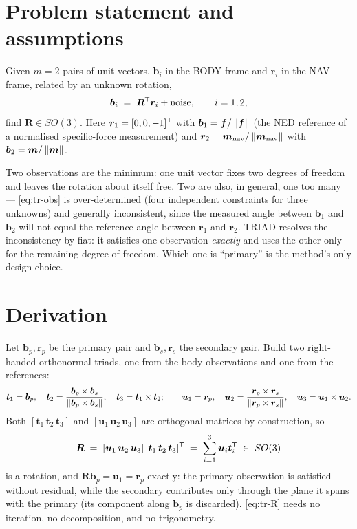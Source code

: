 \section{Problem statement and assumptions}
Given $m=2$ pairs of unit vectors, $\bm{b}_i$ in the BODY frame and $\bm{r}_i$ in the NAV frame,
related by an unknown rotation,
\begin{equation}
\bm{b}_i \;=\; \bm{R}^{\mathsf{T}}\bm{r}_i + \text{noise},\qquad i=1,2,
\label{eq:tr-obs}
\end{equation}
find $\bm{R}\in SO(3)$. Here $\bm{r}_1=[0,0,-1]^{\mathsf{T}}$ with $\bm{b}_1=\bm{f}/\left\lVert \bm{f} \right\rVert$ (the NED
reference of a normalised specific-force measurement) and
$\bm{r}_2=\bm{m}_{\text{nav}}/\left\lVert \bm{m}_{\text{nav}} \right\rVert$ with $\bm{b}_2=\bm{m}/\left\lVert \bm{m} \right\rVert$.

Two observations are the minimum: one unit vector fixes two degrees of freedom and leaves the
rotation about itself free. Two are also, in general, one too many --- \eqref{eq:tr-obs} is
over-determined (four independent constraints for three unknowns) and generally inconsistent, since
the measured angle between $\bm{b}_1$ and $\bm{b}_2$ will not equal the reference angle between
$\bm{r}_1$ and $\bm{r}_2$. TRIAD resolves the inconsistency by fiat: it satisfies one observation
\emph{exactly} and uses the other only for the remaining degree of freedom. Which one is
``primary'' is the method's only design choice.

\section{Derivation}
Let $\bm{b}_p,\bm{r}_p$ be the primary pair and $\bm{b}_s,\bm{r}_s$ the secondary pair. Build two
right-handed orthonormal triads, one from the body observations and one from the references:
\begin{equation}
\bm{t}_1 = \bm{b}_p,\quad
\bm{t}_2 = \frac{\bm{b}_p\times\bm{b}_s}{\left\lVert \bm{b}_p\times\bm{b}_s \right\rVert},\quad
\bm{t}_3 = \bm{t}_1\times\bm{t}_2;
\qquad
\bm{u}_1 = \bm{r}_p,\quad
\bm{u}_2 = \frac{\bm{r}_p\times\bm{r}_s}{\left\lVert \bm{r}_p\times\bm{r}_s \right\rVert},\quad
\bm{u}_3 = \bm{u}_1\times\bm{u}_2 .
\label{eq:tr-triads}
\end{equation}
Both $[\bm{t}_1\,\bm{t}_2\,\bm{t}_3]$ and $[\bm{u}_1\,\bm{u}_2\,\bm{u}_3]$ are orthogonal matrices
by construction, so
\begin{equation}
\bm{R} \;=\; [\bm{u}_1\,\bm{u}_2\,\bm{u}_3]\,[\bm{t}_1\,\bm{t}_2\,\bm{t}_3]^{\mathsf{T}}
 \;=\; \sum_{i=1}^{3}\bm{u}_i\bm{t}_i^{\mathsf{T}} \;\in\;SO(3)
\label{eq:tr-R}
\end{equation}
is a rotation, and $\bm{R}\bm{b}_p=\bm{u}_1=\bm{r}_p$ exactly: the primary observation is satisfied
without residual, while the secondary contributes only through the plane it spans with the primary
(its component along $\bm{b}_p$ is discarded). \eqref{eq:tr-R} needs no iteration, no
decomposition, and no trigonometry.

